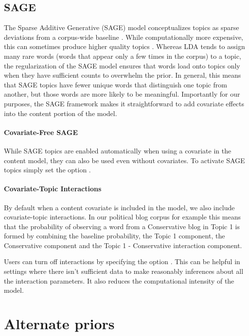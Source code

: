 \documentclass[article,shortnames]{jss}
\begin{document}
\subsection{SAGE}
The Sparse Additive Generative (SAGE) model conceptualizes topics as sparse deviations from a corpus-wide baseline \citep{eisenstein2011sparse}.  While computationally more expensive, this can sometimes produce higher quality topics .  Whereas LDA tends to assign many rare words (words that appear only a few times in the corpus) to a topic, the regularization of the SAGE model ensures that words load onto topics only when they have sufficient counts to overwhelm the prior. In general, this means that SAGE topics have fewer unique words that distinguish one topic from another, but those words are more likely to be meaningful.  Importantly for our purposes, the SAGE framework makes it straightforward to add covariate effects into the content portion of the model.

\paragraph{Covariate-Free SAGE}
While SAGE topics are enabled automatically when using a covariate in the content model, they can also be used even without covariates.  To activate SAGE topics simply set the option .

\paragraph{Covariate-Topic Interactions}
By default when a content covariate is included in the model, we also include covariate-topic interactions.  In our political blog corpus for example this means that the probability of observing a word from a Conservative blog in Topic 1 is formed by combining the baseline probability, the Topic 1 component, the Conservative component and the Topic 1 - Conservative interaction component.

Users can turn off interactions by specifying the option .  This can be helpful in settings where there isn't sufficient data to make reasonably inferences about all the interaction parameters.  It also reduces the computational intensity of the model.

\section{Alternate priors}
\label{sec:priors}
\end{document}
